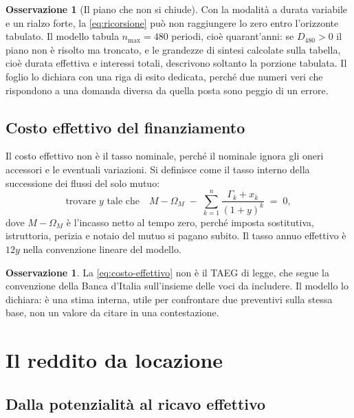 \documentclass[11pt,a4paper]{article}
\theoremstyle{definition}
\newtheorem{osservazione}[definizione]{Osservazione}
\theoremstyle{plain}
\begin{document}
\begin{osservazione}[Il piano che non si chiude]
Con la modalità a durata variabile e un rialzo forte, la \eqref{eq:ricorsione} può non raggiungere lo zero entro l'orizzonte tabulato. Il modello tabula $n_{\max}=480$ periodi, cioè quarant'anni: se $D_{480}>0$ il piano non è risolto ma troncato, e le grandezze di sintesi calcolate sulla tabella, cioè durata effettiva e interessi totali, descrivono soltanto la porzione tabulata. Il foglio lo dichiara con una riga di esito dedicata, perché due numeri veri che rispondono a una domanda diversa da quella posta sono peggio di un errore.
\end{osservazione}

\subsection{Costo effettivo del finanziamento}

Il costo effettivo non è il tasso nominale, perché il nominale ignora gli oneri accessori e le eventuali variazioni. Si definisce come il tasso interno della successione dei flussi del solo mutuo:
\begin{equation}
\text{trovare } y \text{ tale che} \quad
M - \Omega_M \;-\; \sum_{k=1}^{n} \frac{\Gamma_k + x_k}{(1+y)^k} \;=\; 0,
\label{eq:costo-effettivo}
\end{equation}
dove $M-\Omega_M$ è l'incasso netto al tempo zero, perché imposta sostitutiva, istruttoria, perizia e notaio del mutuo si pagano subito. Il tasso annuo effettivo è $12y$ nella convenzione lineare del modello.

\begin{osservazione}
La \eqref{eq:costo-effettivo} non è il TAEG di legge, che segue la convenzione della Banca d'Italia sull'insieme delle voci da includere. Il modello lo dichiara: è una stima interna, utile per confrontare due preventivi sulla stessa base, non un valore da citare in una contestazione.
\end{osservazione}

\section{Il reddito da locazione}

\subsection{Dalla potenzialità al ricavo effettivo}
\end{document}
